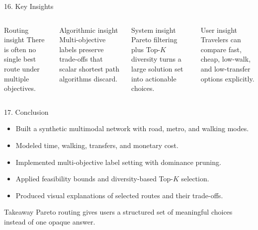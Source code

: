 \documentclass[aspectratio=169]{beamer}
\begin{document}
\begin{frame}{16. Key Insights}
    \begin{columns}[T]
        \begin{block}{Routing insight}
            There is often no single best route under multiple objectives.
        \end{block}

        \begin{block}{Algorithmic insight}
            Multi-objective labels preserve trade-offs that scalar shortest path algorithms discard.
        \end{block}

        \begin{alertblock}{System insight}
            Pareto filtering plus Top-\(K\) diversity turns a large solution set into actionable choices.
        \end{alertblock}

        \begin{block}{User insight}
            Travelers can compare fast, cheap, low-walk, and low-transfer options explicitly.
        \end{block}
    \end{columns}
\end{frame}

\begin{frame}{17. Conclusion}
    \begin{itemize}
        \item Built a synthetic multimodal network with road, metro, and walking modes.
        \item Modeled time, walking, transfers, and monetary cost.
        \item Implemented multi-objective label setting with dominance pruning.
        \item Applied feasibility bounds and diversity-based Top-\(K\) selection.
        \item Produced visual explanations of selected routes and their trade-offs.
    \end{itemize}

    \begin{alertblock}{Takeaway}
        Pareto routing gives users a structured set of meaningful choices instead of one opaque answer.
    \end{alertblock}
\end{frame}
\end{document}
